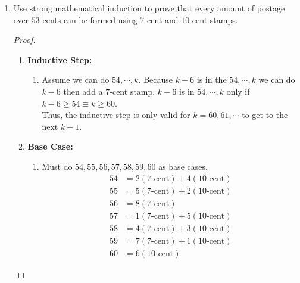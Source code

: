 \documentclass[class=article, crop=false]{standalone}
\begin{document}
\begin{enumerate}
	\item
	  Use strong mathematical induction to prove that every amount of
	  postage over $53$ cents can be formed using $7$-cent and $10$-cent stamps.
	  \begin{proof}
		$ $
		\begin{enumerate}
		  \item[] \textbf{Inductive Step:}
			\begin{enumerate}
			  \item[]
			  Assume we can do $54,\cdots,k$. Because $k-6$ is in the $54,\cdots,k$ we can do $k-6$ then add a $7$-cent stamp.
			  $k-6$ is in $54,\cdots,k$ only if $k-6\geq 54 \equiv k\geq60$.\\
			  Thus, the inductive step is only valid for $k=60,61,\cdots$ to get to the next $k+1$.
			\end{enumerate} 
		  \item[] \textbf{Base Case:}
			\begin{enumerate}
			  \item[] Must do $54,55,56,57,58,59,60$ as base cases.
			  \begin{align*}
				54 &= 2(7\text{-cent}) + 4(10\text{-cent})\\
				55 &= 5(7\text{-cent}) + 2(10\text{-cent})\\
				56 &= 8(7\text{-cent})\\
				57 &= 1(7\text{-cent}) + 5(10\text{-cent})\\
				58 &= 4(7\text{-cent}) + 3(10\text{-cent})\\
				59 &= 7(7\text{-cent}) + 1(10\text{-cent})\\
				60 &= 6(10\text{-cent})
			  \end{align*} 
			\end{enumerate}
		\end{enumerate}
	  \end{proof}
	
	\end{enumerate}
\end{document}
